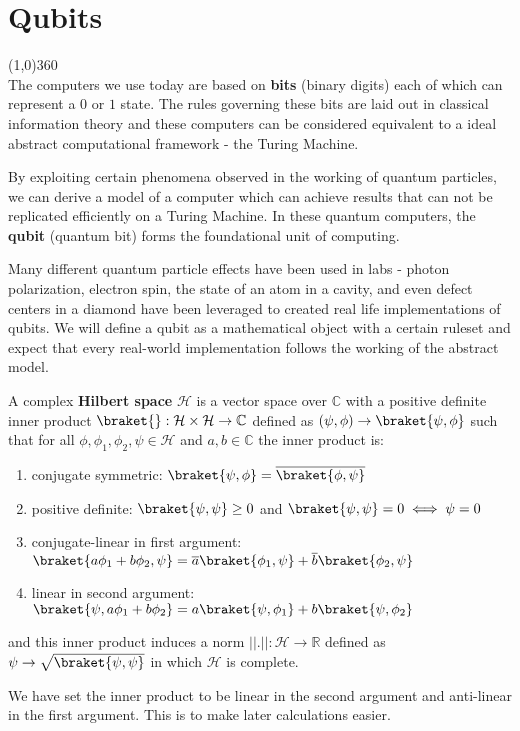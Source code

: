 \chapter{Qubits}

\line(1,0){360} \\

The computers we use today are based on \textbf{bits} (binary digits) each of which can represent a $0$ or $1$ state. The rules governing these bits are laid out in classical information theory and these computers can be considered equivalent to a ideal abstract computational framework - the Turing Machine.

By exploiting certain phenomena observed in the working of quantum particles, we can derive a model of a computer which can achieve results that can not be replicated efficiently on a Turing Machine. In these quantum computers, the \textbf{qubit} (quantum bit) forms the foundational unit of computing.

Many different quantum particle effects have been used in labs - photon polarization, electron spin, the state of an atom in a cavity, and even defect centers in a diamond have been leveraged to created real life implementations of qubits. We will define a qubit as a mathematical object with a certain ruleset and expect that every real-world implementation follows the working of the abstract model.

\begin{samepage}
\begin{defn}
    A complex \textbf{Hilbert space} $\mathcal{H}$ is a vector space over $\mathbb{C}$ with a positive definite inner product $\braket{} : \mathcal{H} \times \mathcal{H} \to \mathbb{C}$ defined as $(\psi,\phi) \to \braket{\psi,\phi}$ such that for all $\phi, \phi_1, \phi_2, \psi \in \mathcal{H}$ and $a, b \in \mathbb{C}$ the inner product is:
    \begin{enumerate}
        \item conjugate symmetric: $\braket{\psi,\phi} = \overline{\braket{\phi,\psi}}$
        \item positive definite: $\braket{\psi, \psi} \geq 0$ and $\braket{\psi, \psi} = 0 \iff \psi = 0$
        \item conjugate-linear in first argument: $\braket{a \phi_1 + b \phi_2, \psi} = \overline{a} \braket{\phi_1, \psi} + \overline{b} \braket{\phi_2, \psi}$
        \item linear in second argument: $\braket{\psi, a \phi_1 + b \phi_2} = a \braket{\psi,\phi_1} + b \braket{\psi,\phi_2}$
    \end{enumerate}
    and this inner product induces a norm $||.|| : \mathcal{H} \to \mathbb{R}$ defined as $\psi \to \sqrt{\braket{\psi,\psi}}$ in which $\mathcal{H}$ is complete.
\end{defn}

\begin{note}
    We have set the inner product to be linear in the second argument and anti-linear in the first argument. This is to make later calculations easier.
\end{note}
\end{samepage}

